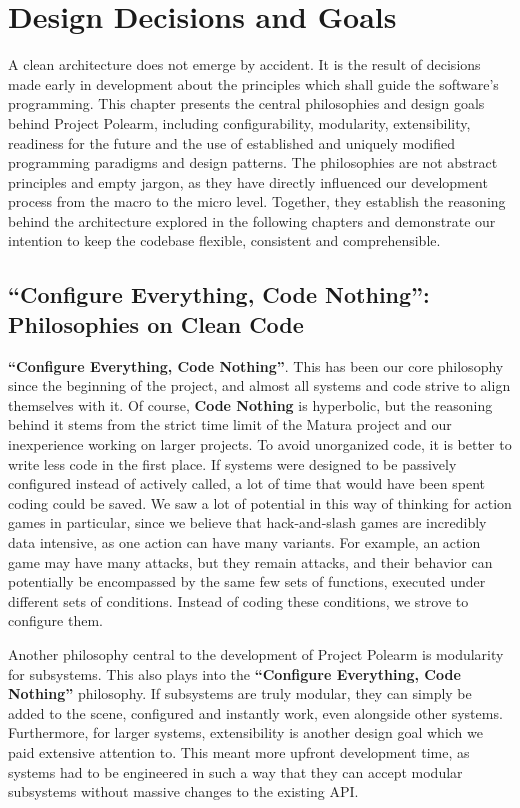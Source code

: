 \documentclass[../Main.tex]{subfiles}
\begin{document}
\section{Design Decisions and Goals}\label{sec:design-decisions-and-goals}

A clean architecture does not emerge by accident. It is the result of decisions made early in development about the principles which shall guide the software's programming. This chapter presents the central philosophies and design goals behind Project Polearm, including configurability, modularity, extensibility, readiness for the future and the use of established and uniquely modified programming paradigms and design patterns. The philosophies are not abstract principles and empty jargon, as they have directly influenced our development process from the macro to the micro level. Together, they establish the reasoning behind the architecture explored in the following chapters and demonstrate our intention to keep the codebase flexible, consistent and comprehensible.

\subsection{\textbf{\enquote{Configure Everything, Code Nothing}}: Philosophies on Clean Code}\label{sec:configure-everything-code-nothing-our}

\textbf{\enquote{Configure Everything, Code Nothing}}. This has been our core philosophy since the beginning of the project, and almost all systems and code strive to align themselves with it. Of course, \textbf{Code Nothing} is hyperbolic, but the reasoning behind it stems from the strict time limit of the Matura project and our inexperience working on larger projects. To avoid unorganized code, it is better to write less code in the first place. If systems were designed to be passively configured instead of actively called, a lot of time that would have been spent coding could be saved. We saw a lot of potential in this way of thinking for action games in particular, since we believe that hack-and-slash games are incredibly data intensive, as one action can have many variants. For example, an action game may have many attacks, but they remain attacks, and their behavior can potentially be encompassed by the same few sets of functions, executed under different sets of conditions. Instead of coding these conditions, we strove to configure them.

Another philosophy central to the development of Project Polearm is modularity for subsystems. This also plays into the \textbf{\enquote{Configure Everything, Code Nothing}} philosophy. If subsystems are truly modular, they can simply be added to the scene, configured and instantly work, even alongside other systems. Furthermore, for larger systems, extensibility is another design goal which we paid extensive attention to. This meant more upfront development time, as systems had to be engineered in such a way that they can accept modular subsystems without massive changes to the existing API.
\end{document}
